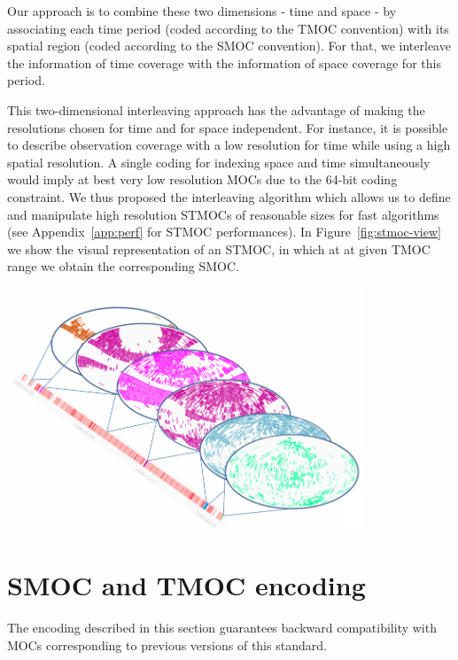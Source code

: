 \documentclass[11pt,a4paper]{ivoa}
\begin{document}
Our approach is to combine these two dimensions - time and space - by
associating each time period (coded according to the TMOC
convention) with its spatial region (coded according to the SMOC
convention). For that, we interleave the information of time coverage
with the information of space coverage for this period.

This two-dimensional interleaving approach has the advantage of making
the resolutions chosen for time and for space independent. For
instance, it is possible to describe observation coverage with a low
resolution for time while using a high spatial
resolution.
A single coding for indexing space and time simultaneously would imply
at best very low resolution MOCs due to the 64-bit coding constraint. 
We thus proposed the interleaving algorithm which allows us to define and
manipulate high resolution STMOCs of reasonable sizes for fast algorithms
(see Appendix~\ref{app:perf} for STMOC performances).
In Figure~\ref{fig:stmoc-view} we show the visual representation of an STMOC,
in which at at given TMOC range we obtain the corresponding SMOC. 
 
\begin{adjustbox}{center,caption={STMOC visual representation in which
      at at given TMOC range we obtain the corresponding SMOC},
    label={fig:stmoc-view},nofloat=figure,vspace=\bigskipamount}
\includegraphics[width=0.8\textwidth]{stmoc_view.png}
\end{adjustbox}

\section{SMOC and TMOC encoding}
The encoding described in this section guarantees backward compatibility
with MOCs corresponding to previous versions of this standard.
\end{document}

